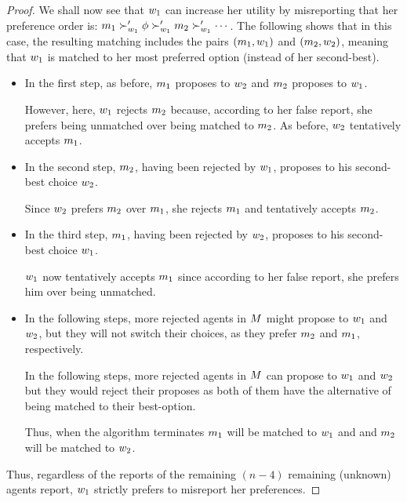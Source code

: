 \begin{proof}
    We shall now see that $w_1$ can increase her utility by misreporting that her preference order is: $m_1 \succ'_{w_1} \phi \succ'_{w_1} m_2 \succ'_{w_1} \cdots $.
    The following shows that in this case, the resulting matching includes the pairs $(m_1, w_1)$ and $(m_2, w_2)$, meaning that $w_1$ is matched to her most preferred option (instead of her second-best).
    \begin{itemize}
        \item In the first step, as before, $m_1$ proposes to $w_2$ and $m_2$ proposes to $w_1$.

        However, here,  $w_1$ rejects $m_2$ because, according to her false report, she prefers being unmatched over being matched to $m_2$.
        As before, $w_2$ tentatively accepts $m_1$.


        \item In the second step, $m_2$, having been rejected by $w_1$, proposes to his second-best choice $w_2$.

        Since $w_2$ prefers $m_2$ over $m_1$,  she rejects $m_1$ and tentatively accepts $m_2$.


        \item In the third step, $m_1$, having been rejected by  $w_2$, proposes to his second-best choice $w_1$.

        $w_1$ now tentatively accepts $m_1$ since according to her false report, she prefers him over being unmatched.
        
        
        \item In the following steps, more rejected agents in $M$ might propose to $w_1$ and $w_2$, but they will not switch their choices, as they prefer $m_2$ and $m_1$, respectively. 
        
        
        In the following steps, more rejected agents in $M$ can propose to $w_1$ and $w_2$ but they would reject their proposes as both of them have the alternative of being matched to their best-option. 

        Thus, when the algorithm terminates $m_1$ will be matched to $w_1$ and and $m_2$ will be matched to $w_2$. 
    \end{itemize}
    

    Thus, regardless of the reports of the remaining $(n-4)$ remaining (unknown) agents report, $w_1$ strictly prefers to misreport her preferences.
\end{proof}

